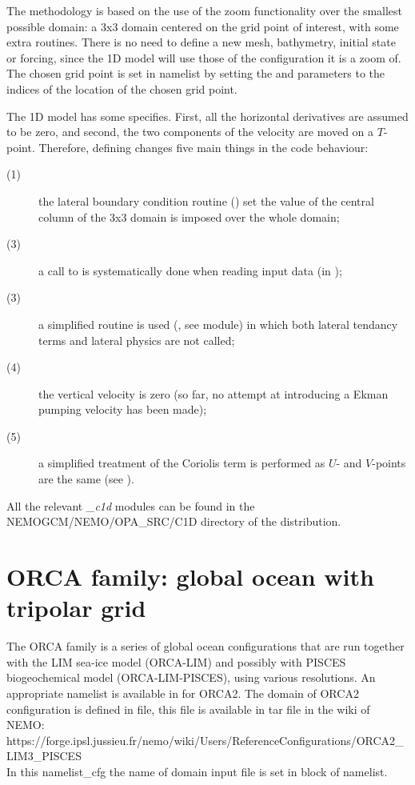 \documentclass[../main/NEMO_manual]{subfiles}
\begin{document}
The methodology is based on the use of the zoom functionality over the smallest possible domain:
a 3x3 domain centered on the grid point of interest, with some extra routines.
There is no need to define a new mesh, bathymetry, initial state or forcing,
since the 1D model will use those of the configuration it is a zoom of.
The chosen grid point is set in \textit{} namelist by
setting the  and  parameters to the indices of the location of the chosen grid point.

The 1D model has some specifies. First, all the horizontal derivatives are assumed to be zero,
and second, the two components of the velocity are moved on a $T$-point. 
Therefore, defining  changes five main things in the code behaviour: 
\begin{description}
\item[(1)]
  the lateral boundary condition routine () set the value of the central column of
  the 3x3 domain is imposed over the whole domain;
\item[(3)]
  a call to  is systematically done when reading input data (\ie in );
\item[(3)]
  a simplified  routine is used (, see  module) in which
  both lateral tendancy terms and lateral physics are not called;
\item[(4)]
  the vertical velocity is zero
  (so far, no attempt at introducing a Ekman pumping velocity has been made);
\item[(5)]
  a simplified treatment of the Coriolis term is performed as $U$- and $V$-points are the same
  (see ).
\end{description}
All the relevant \textit{\_c1d} modules can be found in the NEMOGCM/NEMO/OPA\_SRC/C1D directory of
the \NEMO distribution.


\section{ORCA family: global ocean with tripolar grid}
\label{sec:CFG_orca}

The ORCA family is a series of global ocean configurations that are run together with
the LIM sea-ice model (ORCA-LIM) and possibly with PISCES biogeochemical model (ORCA-LIM-PISCES),
using various resolutions.
An appropriate namelist is available in  for ORCA2.
The domain of ORCA2 configuration is defined in  file,
this file is available in tar file in the wiki of NEMO: \\
https://forge.ipsl.jussieu.fr/nemo/wiki/Users/ReferenceConfigurations/ORCA2\_LIM3\_PISCES \\
In this namelist\_cfg the name of domain input file is set in  block of namelist. 
\end{document}
